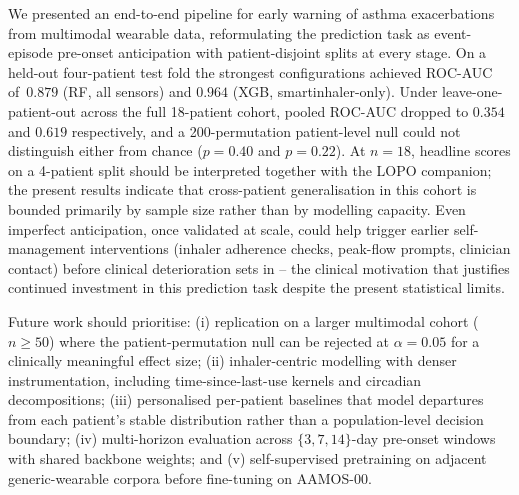 \documentclass[11pt,a4paper]{article}
\newcommand{\rocauc}{ROC\nobreakdash-AUC}
\begin{document}
We presented an end-to-end pipeline for early warning of asthma
exacerbations from multimodal wearable data, reformulating the
prediction task as event-episode pre-onset anticipation with
patient-disjoint splits at every stage.  On a held-out four-patient
test fold the strongest configurations achieved \rocauc{}
of~$0.879$ (RF, all sensors) and $0.964$ (XGB,
smartinhaler-only).  Under leave-one-patient-out across the full
18-patient cohort, pooled \rocauc{} dropped to $0.354$ and $0.619$
respectively, and a 200-permutation patient-level null could not
distinguish either from chance ($p=0.40$ and $p=0.22$).  At
$n=18$, headline scores on a 4-patient split should be interpreted
together with the LOPO companion; the present results indicate
that cross-patient generalisation in this cohort is bounded
primarily by sample size rather than by modelling capacity.
Even imperfect anticipation, once validated at scale, could help
trigger earlier self-management interventions (inhaler adherence
checks, peak-flow prompts, clinician contact) before clinical
deterioration sets in -- the clinical motivation that justifies
continued investment in this prediction task despite the present
statistical limits.

Future work should prioritise: (i) replication on a larger
multimodal cohort ($n\geq 50$) where the patient-permutation null
can be rejected at $\alpha=0.05$ for a clinically meaningful
effect size; (ii) inhaler-centric modelling with denser
instrumentation, including time-since-last-use kernels and
circadian decompositions; (iii) personalised per-patient baselines
that model departures from each patient's stable distribution
rather than a population-level decision boundary; (iv) multi-horizon
evaluation across $\{3,7,14\}$-day pre-onset windows with shared
backbone weights; and (v) self-supervised pretraining on adjacent
generic-wearable corpora before fine-tuning on AAMOS-00.
\end{document}
